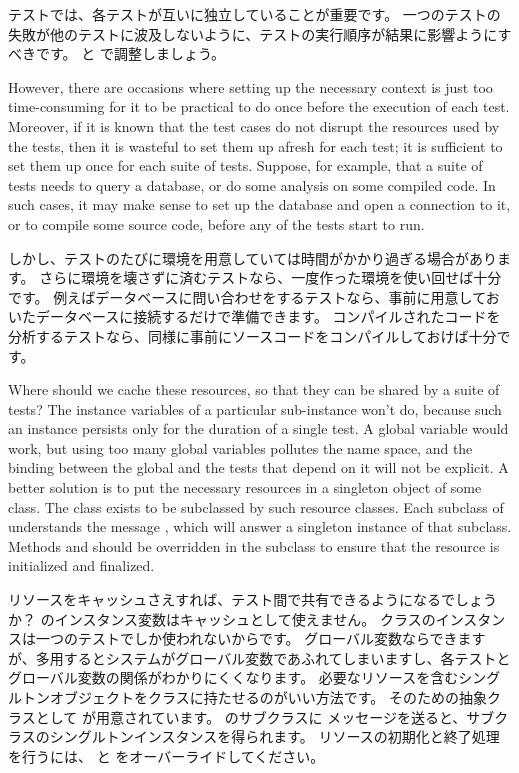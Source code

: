 \documentclass[a4paper,10pt,twoside]{book}
\begin{document}
テストでは、各テストが互いに独立していることが重要です。
一つのテストの失敗が他のテストに波及しないように、テストの実行順序が結果に影響ようにすべきです。
 と  で調整しましょう。

However, there are occasions where setting up the necessary context is just too time-consuming for it to be practical to do once before the execution of each test.
Moreover, if it is known that the test cases do not disrupt the resources used by the tests, then it is wasteful to set them up afresh for each test; it is sufficient to set them up once for each suite of tests.
Suppose, for example, that a suite of tests needs to query a database, or do some analysis on some compiled code.
In such cases, it may make sense to set up the database and open a connection to it, or to compile some source code, before any of the tests start to run.
\fi

しかし、テストのたびに環境を用意していては時間がかかり過ぎる場合があります。
さらに環境を壊さずに済むテストなら、一度作った環境を使い回せば十分です。
例えばデータベースに問い合わせをするテストなら、事前に用意しておいたデータベースに接続するだけで準備できます。
コンパイルされたコードを分析するテストなら、同様に事前にソースコードをコンパイルしておけば十分です。

Where should we cache these resources, so that they can be shared by a suite of tests?
The instance variables of a particular  sub-instance won't do, because such an instance persists only for the duration of a single test.
A global variable would work, but using too many global variables pollutes the name space, and the binding between the global and the tests that depend on it will not be explicit.
A better solution is to put the necessary resources in a singleton object of some class.
The class  exists to be subclassed by such resource classes.
Each subclass of  understands the message  , which will answer a singleton instance of that subclass.
Methods  and  should be overridden in the subclass to ensure that the resource is initialized and finalized.
\fi

リソースをキャッシュさえすれば、テスト間で共有できるようになるでしょうか？
 のインスタンス変数はキャッシュとして使えません。
 クラスのインスタンスは一つのテストでしか使われないからです。
グローバル変数ならできますが、多用するとシステムがグローバル変数であふれてしまいますし、各テストとグローバル変数の関係がわかりにくくなります。
必要なリソースを含むシングルトンオブジェクトをクラスに持たせるのがいい方法です。
そのための抽象クラスとして  が用意されています。
 のサブクラスに  メッセージを送ると、サブクラスのシングルトンインスタンスを得られます。
リソースの初期化と終了処理を行うには、  と  をオーバーライドしてください。
\end{document}

